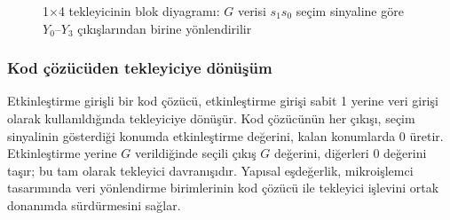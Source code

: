 \begin{figure}[H]
\centering
{}
\caption[1×4 tekleyicinin blok diyagramı]{1×4 tekleyicinin blok diyagramı: $G$ verisi $s_1 s_0$ seçim sinyaline göre $Y_0$--$Y_3$ çıkışlarından birine yönlendirilir}
\label{fig:B.demux-1to4}
\end{figure}

\subsubsection{Kod çözücüden tekleyiciye dönüşüm}
Etkinleştirme girişli bir kod çözücü, etkinleştirme girişi sabit 1 yerine veri girişi olarak kullanıldığında tekleyiciye dönüşür. Kod çözücünün her çıkışı, seçim sinyalinin gösterdiği konumda etkinleştirme değerini, kalan konumlarda 0 üretir. Etkinleştirme yerine $G$ verildiğinde seçili çıkış $G$ değerini, diğerleri 0 değerini taşır; bu tam olarak tekleyici davranışıdır. Yapısal eşdeğerlik, mikroişlemci tasarımında veri yönlendirme birimlerinin kod çözücü ile tekleyici işlevini ortak donanımda sürdürmesini sağlar.


